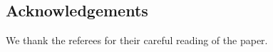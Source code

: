 \documentclass[11pt]{amsart}
\newcommand{\N}{\ensuremath{\mathbb{N}}}%
\newcommand{\Alt}{\ensuremath{\operatorname{Alt}}}%
\newcommand{\vol}{\ensuremath{\operatorname{vol}}}%
\theoremstyle{definition}
\theoremstyle{plain}
\newtheorem{thm}[defin]{Theorem}
\theoremstyle{remark}
\begin{document}
\subsection*{Acknowledgements} We thank the referees for their careful reading of the paper. 




%




\bigskip


%
%

\end{document}
